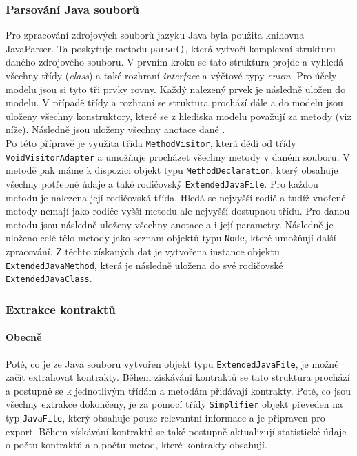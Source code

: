 			\subsubsection{Parsování Java souborů}	    
				Pro zpracování zdrojových souborů jazyku Java byla použita knihovna JavaParser. Ta poskytuje metodu \texttt{parse()}, která vytvoří komplexní strukturu daného zdrojového souboru. V prvním kroku se tato struktura projde a vyhledá všechny třídy (\emph{class}) a také rozhraní \emph{interface} a výčtové typy \emph{enum}. Pro účely modelu jsou si tyto tři prvky rovny. Každý nalezený prvek je následně uložen do modelu. V případě třídy a rozhraní se struktura prochází dále a do modelu jsou uloženy všechny konstruktory, které se z hlediska modelu považují za metody (viz níže). Následně jsou uloženy všechny anotace dané .\\
			
				Po této přípravě je využita třída \texttt{MethodVisitor}, která dědí od třídy \texttt{VoidVisitorAdapter} a umožňuje procházet všechny metody v daném souboru. V metodě pak máme k dispozici objekt typu \texttt{MethodDeclaration}, který obsahuje všechny potřebné údaje a také rodičovský \texttt{ExtendedJavaFile}. Pro každou metodu je nalezena její rodičovská třída. Hledá se nejvyšší rodič a tudíž vnořené metody nemají jako rodiče vyšší metodu ale nejvyšší dostupnou třídu. Pro danou metodu jsou následně uloženy všechny anotace a i její parametry. Následně je uloženo celé tělo metody jako seznam objektů typu \texttt{Node}, které umožňují další zpracování. Z těchto získaných dat je vytvořena instance objektu \texttt{ExtendedJavaMethod}, která je následně uložena do své rodičovské \texttt{ExtendedJavaClass}.
				
			\subsubsection{Extrakce kontraktů}
			
			\paragraph{Obecně}
				Poté, co je ze Java souboru vytvořen objekt typu \texttt{ExtendedJavaFile}, je možné začít extrahovat kontrakty. Během získávání kontraktů se tato struktura prochází a postupně se k jednotlivým třídám a metodám přidávají kontrakty. Poté, co jsou všechny extrakce dokončeny, je za pomocí třídy \texttt{Simplifier} objekt převeden na typ \texttt{JavaFile}, který obsahuje pouze relevantní informace a je připraven pro export.	Během získávání kontraktů se také postupně aktualizují statistické údaje o počtu kontraktů a o počtu metod, které kontrakty obsahují.	
			
